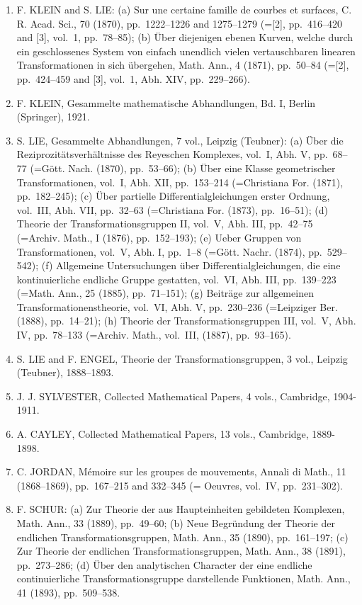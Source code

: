\begin{enumerate}
\def\labelenumi{\arabic{enumi}.}
\item
  F. KLEIN and S. LIE: (a) Sur une certaine famille de courbes et surfaces, C. R. Acad. Sci., 70 (1870), pp.~1222--1226 and 1275--1279 (={[}2{]}, pp.~416--420 and {[}3{]}, vol.~1, pp.~78--85); (b) Über diejenigen ebenen Kurven, welche durch ein geschlossenes System von einfach unendlich vielen vertauschbaren linearen Transformationen in sich übergehen, Math. Ann., 4 (1871), pp.~50--84 (={[}2{]}, pp.~424--459 and {[}3{]}, vol.~1, Abh. XIV, pp.~229--266).
\item
  F. KLEIN, Gesammelte mathematische Abhandlungen, Bd. I, Berlin (Springer), 1921.
\item
  S. LIE, Gesammelte Abhandlungen, 7 vol., Leipzig (Teubner): (a) Über die Reziprozitätsverhältnisse des Reyeschen Komplexes, vol.~I, Abh. V, pp.~68--77 (=Gött. Nach. (1870), pp.~53--66); (b) Über eine Klasse geometrischer Transformationen, vol.~I, Abh. XII, pp.~153--214 (=Christiana For. (1871), pp.~182--245); (c) Über partielle Differentialgleichungen erster Ordnung, vol.~III, Abh. VII, pp.~32--63 (=Christiana For. (1873), pp.~16--51); (d) Theorie der Transformationsgruppen II, vol.~V, Abh. III, pp.~42--75 (=Archiv. Math., I (1876), pp.~152--193); (e) Ueber Gruppen von Transformationen, vol.~V, Abh. I, pp.~1--8 (=Gött. Nachr. (1874), pp.~529--542); (f) Allgemeine Untersuchungen über Differentialgleichungen, die eine kontinuierliche endliche Gruppe gestatten, vol.~VI, Abh. III, pp.~139--223 (=Math. Ann., 25 (1885), pp.~71--151); (g) Beiträge zur allgemeinen Transformationenstheorie, vol.~VI, Abh. V, pp.~230--236 (=Leipziger Ber. (1888), pp.~14--21); (h) Theorie der Transformationsgruppen III, vol.~V, Abh. IV, pp.~78--133 (=Archiv. Math., vol.~III, (1887), pp.~93--165).
\item
  S. LIE and F. ENGEL, Theorie der Transformationsgruppen, 3 vol., Leipzig (Teubner), 1888--1893.
\item
  J. J. SYLVESTER, Collected Mathematical Papers, 4 vols., Cambridge, 1904-1911.
\item
  A. CAYLEY, Collected Mathematical Papers, 13 vols., Cambridge, 1889-1898.
\item
  C. JORDAN, Mémoire sur les groupes de mouvements, Annali di Math., 11 (1868--1869), pp.~167--215 and 332--345 (= Oeuvres, vol.~IV, pp.~231--302).
\item
  F. SCHUR: (a) Zur Theorie der aus Haupteinheiten gebildeten Komplexen, Math. Ann., 33 (1889), pp.~49--60; (b) Neue Begründung der Theorie der endlichen Transformationsgruppen, Math. Ann., 35 (1890), pp.~161--197; (c) Zur Theorie der endlichen Transformationsgruppen, Math. Ann., 38 (1891), pp.~273--286; (d) Über den analytischen Character der eine endliche continuierliche Transformationsgruppe darstellende Funktionen, Math. Ann., 41 (1893), pp.~509--538.

\end{enumerate}
